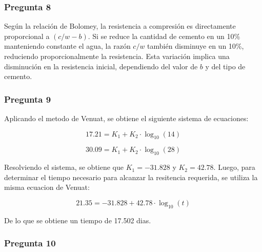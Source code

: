 \subsubsection*{Pregunta 8} 
Según la relación de Bolomey, la resistencia a compresión es directamente proporcional a \((c/w - b)\). Si se reduce la cantidad de cemento en un 10\% manteniendo constante el agua, la razón \( c/w \) también disminuye en un 10\%, reduciendo proporcionalmente la resistencia. Esta variación implica una disminución en la resistencia inicial, dependiendo del valor de \( b \) y del tipo de cemento.

\subsubsection*{Pregunta 9} 

Aplicando el metodo de Venuat, se obtiene el siguiente sistema de ecuaciones:

\begin{equation}
    17.21 = K_1 + K_2 \cdot \log_{10}(14)
\end{equation}

\begin{equation}
    30.09 = K_1 + K_2 \cdot \log_{10}(28)
\end{equation}

Resolviendo el sistema, se obtiene que \( K_1 = -31.828 \) y \( K_2 = 42.78 \). Luego, para determinar el tiempo necesario para alcanzar la resitencia requerida, se utiliza la misma ecuacion de Venuat:

\begin{equation}
    21.35 = -31.828 + 42.78 \cdot \log_{10}(t)
\end{equation}

De lo que se obtiene un tiempo de 17.502 dias.
\subsubsection*{Pregunta 10} 



